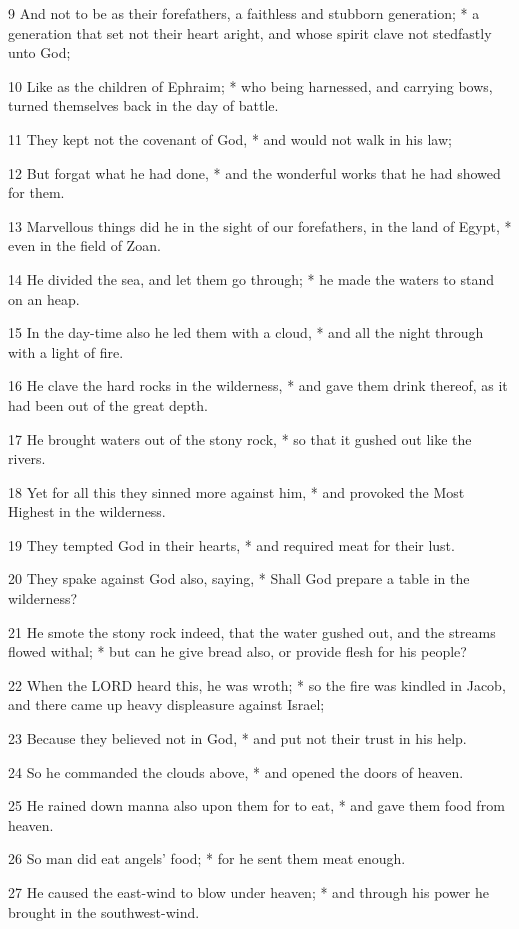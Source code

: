 9 And not to be as their forefathers, a faithless and
stubborn generation; * a generation that set not their heart aright, and
whose spirit clave not stedfastly unto God;

10 Like as the children of Ephraim; * who being harnessed,
and carrying bows, turned themselves back in the day of battle.

11 They kept not the covenant of God, * and would not
walk in his law;

12 But forgat what he had done, * and the wonderful
works that he had showed for them.

13 Marvellous things did
he in the sight of our forefathers, in the land of Egypt, * even in the
field of Zoan.

14 He divided the sea, and let them go through; * he
made the waters to stand on an heap.

15 In the day-time also he led them with a cloud, *
and all the night through with a light of fire.

16 He clave the hard rocks in the wilderness, * and
gave them drink thereof, as it had been out of the great depth.

17 He brought waters out of the stony rock, * so that
it gushed out like the rivers.

18 Yet for all this they sinned more against him, *
and provoked the Most Highest in the wilderness.

19 They tempted God in their hearts, * and required
meat for their lust.

20 They spake against God also, saying, * Shall God
prepare a table in the wilderness?

21 He smote the stony rock indeed, that the water gushed
out, and the streams flowed withal; * but can he give bread also, or provide
flesh for his people?

22 When the LORD heard this,
he was wroth; * so the fire was kindled in Jacob, and there came up heavy
displeasure against Israel;

23 Because they believed not in God, * and put not
their trust in his help.

24 So he commanded the clouds above, * and opened the
doors of heaven.

25 He rained down manna also upon them for to eat,
* and gave them food from heaven.

26 So man did eat angels' food; * for he sent them
meat enough.

27 He caused the east-wind to blow under heaven; *
and through his power he brought in the southwest-wind.

